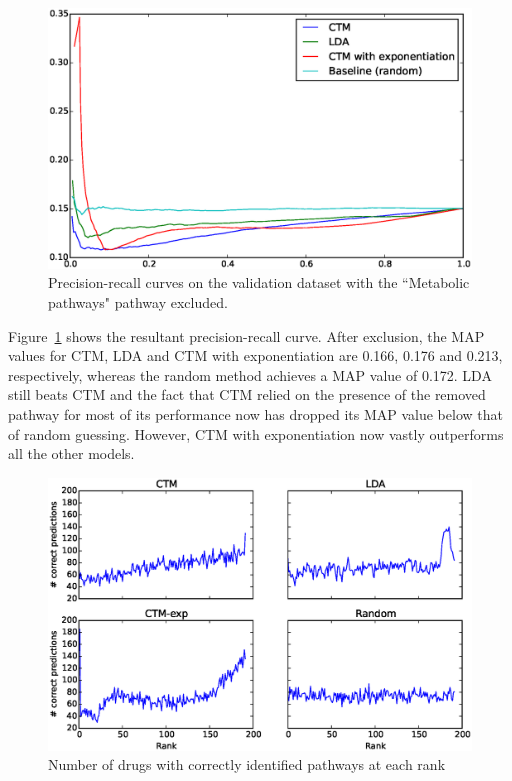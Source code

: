 \documentclass[12pt,a4paper,twoside,openright]{report}
\begin{document}
\begin{figure}[!htb]
\includegraphics[width=\textwidth]{ctd-pr-curves-no1100.eps}
\caption{Precision-recall curves on the validation dataset with the ``Metabolic pathways" pathway excluded.}
\label{fig:ctd-pr-curves-no1100}
\end{figure}

Figure~\ref{fig:ctd-pr-curves-no1100} shows the resultant precision-recall curve. After exclusion, the MAP values for CTM, LDA and CTM with exponentiation are 0.166, 0.176 and 0.213, respectively, whereas the random method achieves a MAP value of 0.172. LDA still beats CTM and the fact that CTM relied on the presence of the removed pathway for most of its performance now has dropped its MAP value below that of random guessing. However, CTM with exponentiation now vastly outperforms all the other models.

\begin{figure}[!htb]
\includegraphics[width=\textwidth]{ctd-side-plots.eps}
\caption{Number of drugs with correctly identified pathways at each rank}
\label{fig:ctd-side-plots}
\end{figure}
\end{document}
